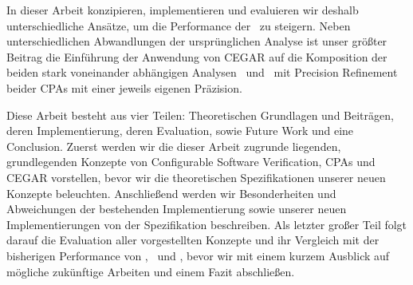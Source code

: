 In dieser Arbeit konzipieren, implementieren und evaluieren wir deshalb unterschiedliche Ans\"atze, um die Performance der \symbolicExecutionCPA\ zu steigern.
Neben unterschiedlichen Abwandlungen der urspr\"unglichen Analyse ist unser gr\"o\ss ter Beitrag die Einf\"uhrung
der Anwendung von CEGAR \cite{Clarke2003} auf die Komposition der beiden stark voneinander abh\"angigen Analysen \ und \constraintsCPA\ mit Precision Refinement beider CPAs mit einer jeweils eigenen Pr\"azision.

Diese Arbeit besteht aus vier Teilen: Theoretischen Grundlagen und Beitr\"agen, deren Implementierung, deren Evaluation, sowie Future Work und eine Conclusion.
Zuerst werden wir die dieser Arbeit zugrunde liegenden, grundlegenden Konzepte von Configurable Software Verification, CPAs und CEGAR vorstellen, bevor wir die theoretischen Spezifikationen unserer neuen Konzepte beleuchten.
Anschlie\ss end werden wir Besonderheiten und Abweichungen der bestehenden Implementierung sowie unserer neuen Implementierungen von der Spezifikation beschreiben.
Als letzter gro\ss er Teil folgt darauf die Evaluation aller vorgestellten Konzepte und ihr Vergleich mit der bisherigen Performance von  , \predicateCPA\ und \symbolicExecutionCPA , bevor wir mit einem kurzem Ausblick auf m\"ogliche zuk\"unftige Arbeiten und einem Fazit abschlie\ss en.